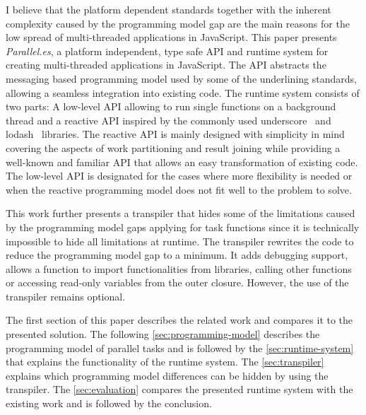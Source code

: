 I believe that the platform dependent standards together with the inherent complexity caused by the programming model gap are the main reasons for the low spread of multi-threaded applications in JavaScript. This paper presents \textit{Parallel.es}, a platform independent, type safe API and runtime system for creating multi-threaded applications in JavaScript. The API abstracts the messaging based programming model used by some of the underlining standards, allowing a seamless integration into existing code. The runtime system consists of two parts: A low-level API allowing to run single functions on a background thread and a reactive API inspired by the commonly used underscore~\cite{underscorejs} and lodash~\cite{lodash} libraries. The reactive API is mainly designed with simplicity in mind covering the aspects of work partitioning and result joining while providing a well-known and familiar API that allows an easy transformation of existing code. The low-level API is designated for the cases where more flexibility is needed or when the reactive programming model does not fit well to the problem to solve. 

This work further presents a transpiler that hides some of the limitations caused by the programming model gaps applying for task functions since it is technically impossible to hide all limitations at runtime. The transpiler rewrites the code to reduce the programming model gap to a minimum. It adds debugging support, allows a function to import functionalities from libraries, calling other functions or accessing read-only variables from the outer closure. However, the use of the transpiler remains optional. 


The first section of this paper describes the related work and compares it to the presented solution. The following \cref{sec:programming-model} describes the programming model of parallel tasks and is followed by the \cref{sec:runtime-system} that explains the functionality of the runtime system. The \cref{sec:transpiler} explains which programming model differences can be hidden by using the transpiler. The \cref{sec:evaluation} compares the presented runtime system with the existing work and is followed by the conclusion. 